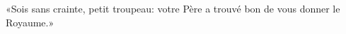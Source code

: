 \encetemps \jesusdisciples
	«Sois sans crainte, petit troupeau:
	votre Père a trouvé bon de vous donner le Royaume.»
